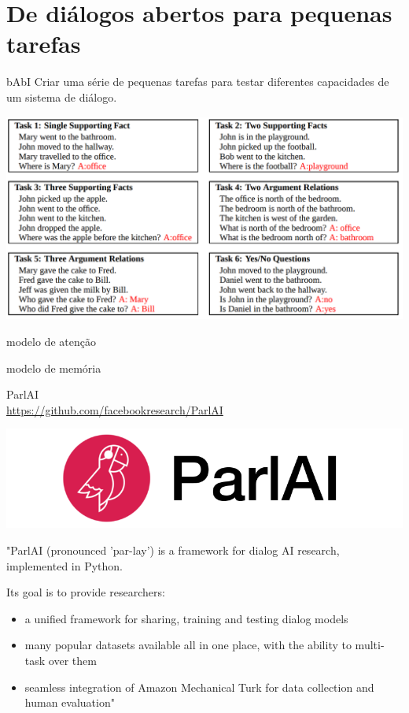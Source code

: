 \documentclass[10pt]{beamer}
\begin{document}
\section{De diálogos abertos para pequenas tarefas}

\begin{frame}{bAbI \cite{WestonBCM15}}
Criar uma série de pequenas tarefas para testar diferentes capacidades de um sistema de diálogo.


\begin{center}
\includegraphics[scale=0.25]{images/babi.png}
\end{center}
\end{frame}

\begin{frame}{modelo de atenção}

\end{frame}


\begin{frame}{modelo de memória}

\end{frame}

\begin{frame}{ParlAI \\ \url{https://github.com/facebookresearch/ParlAI}}

\begin{center}
\includegraphics[scale=0.84]{images/parlai.png}
\end{center}

"ParlAI (pronounced 'par-lay') is a framework for dialog AI research, implemented in Python.

Its goal is to provide researchers:

\begin{itemize}
\item a unified framework for sharing, training and testing dialog models
\item many popular datasets available all in one place, with the ability to multi-task over them
\item seamless integration of Amazon Mechanical Turk for data collection and human evaluation"
\end{itemize}

\end{frame}
\end{document}
